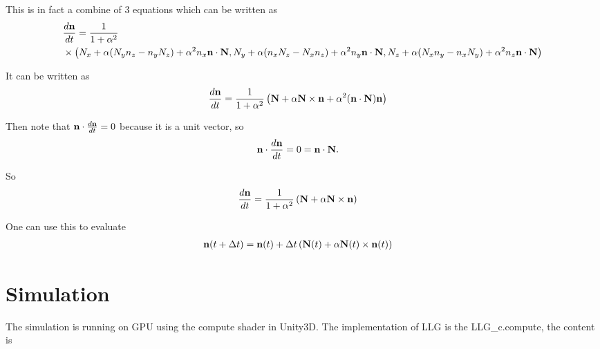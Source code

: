\documentclass[aps,superscriptaddress,groupedaddress]{revtex4}  %
\begin{document}
This is in fact a combine of $3$ equations which can be written as
\begin{equation}
\begin{split}
&\frac{d{\bf n}}{dt}=\frac{1}{1+\alpha ^2}\\
&\times \left(N_x+\alpha(N_yn_z-n_yN_z)+\alpha^2 n_x {\bf n}\cdot {\bf N},N_y+\alpha (n_xN_z-N_xn_z)+\alpha^2n_y{\bf n}\cdot {\bf N},N_z+\alpha(N_xn_y-n_xN_y)+\alpha^2 n_z{\bf n}\cdot {\bf N}\right)
\end{split}
\end{equation}

It can be written as
\begin{equation}
\begin{split}
&\frac{d{\bf n}}{dt}=\frac{1}{1+\alpha^2}\left({\bf N}+\alpha {\bf N}\times {\bf n}+\alpha ^2 ({\bf n}\cdot {\bf N}){\bf n}\right)
\end{split}
\end{equation}

Then note that ${\bf n}\cdot \frac{d{\bf n}}{dt}=0$ because it is a unit vector, so
\begin{equation}
\begin{split}
&{\bf n}\cdot \frac{d{\bf n}}{dt}=0={\bf n}\cdot {\bf N}.
\end{split}
\end{equation}

So
\begin{equation}
\begin{split}
&\frac{d{\bf n}}{dt}=\frac{1}{1+\alpha^2}\left({\bf N}+\alpha {\bf N}\times {\bf n}\right)
\end{split}
\end{equation}

One can use this to evaluate
\begin{equation}
\begin{split}
&{\bf n}(t+\Delta t)={\bf n}(t)+\Delta t \left({\bf N}(t)+\alpha {\bf N}(t)\times {\bf n}(t)\right)
\end{split}
\end{equation}

\section{\label{sec:4}Simulation}

The simulation is running on GPU using the compute shader in Unity3D. The implementation of LLG is the LLG\_c.compute, the content is

\end{document}
